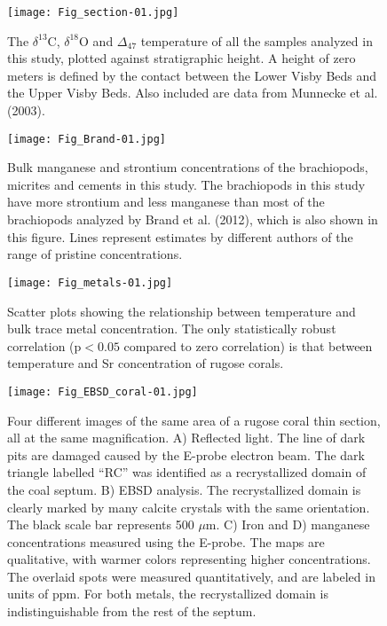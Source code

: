 \documentclass{article}
\newcommand{\deltao}{$\delta^{18}$}
\newcommand{\deltac}{$\delta^{13}$}
\begin{document}
\begin{sidewaysfigure}[htb]
\centering
\texttt{[image: Fig\_section-01.jpg]}
\caption{The \deltac C, \deltao O and $\Delta_{47}$ temperature of all the samples analyzed in this study, plotted against stratigraphic height. A height of zero meters is defined by the contact between the Lower Visby Beds and the Upper Visby Beds. Also included are data from Munnecke et al. (2003).}
\label{section}
\end{sidewaysfigure}

\begin{figure}[htb]
\centering
\texttt{[image: Fig\_Brand-01.jpg]}
\caption{Bulk manganese and strontium concentrations of the brachiopods, micrites and cements in this study. The brachiopods in this study have more strontium and less manganese than most of the brachiopods analyzed by Brand et al. (2012), which is also shown in this figure. Lines represent estimates by different authors of the range of pristine concentrations.}
\label{Brand}
\end{figure}

\begin{figure}[htb]
\centering
\texttt{[image: Fig\_metals-01.jpg]}
\caption{Scatter plots showing the relationship between temperature and bulk trace metal concentration. The only statistically robust correlation ($\text{p}<0.05$ compared to zero correlation) is that between temperature and Sr concentration of rugose corals.}
\label{metals}
\end{figure}

\begin{figure}[htb]
\centering
\texttt{[image: Fig\_EBSD\_coral-01.jpg]}
\caption{Four different images of the same area of a rugose coral thin section, all at the same magnification. A) Reflected light. The line of dark pits are damaged caused by the E-probe electron beam. The dark triangle labelled ``RC'' was identified as a recrystallized domain of the coal septum. B) EBSD analysis. The recrystallized domain is clearly marked by many calcite crystals with the same orientation. The black scale bar represents 500 $\mu$m. C) Iron and D) manganese concentrations measured using the E-probe. The maps are qualitative, with warmer colors representing higher concentrations. The overlaid spots were measured quantitatively, and are labeled in units of ppm. For both metals, the recrystallized domain is indistinguishable from the rest of the septum.}
\label{EBSD_coral}
\end{figure}
\end{document}
